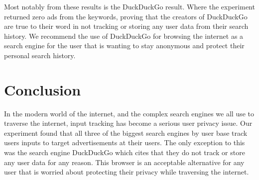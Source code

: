 \documentclass{article}
\begin{document}
Most notably from these results is the DuckDuckGo result. Where the experiment returned zero ads from the keywords, proving that the creators of DuckDuckGo are true to their word in not tracking or storing any user data from their search history. We recommend the use of DuckDuckGo for browsing the internet as a search engine for the user that is wanting to stay anonymous and protect their personal search history. 



\section{Conclusion}

  In the modern world of the internet, and the complex search engines we all use to traverse the internet, input tracking has become a serious user privacy issue. Our experiment found that all three of the biggest search engines by user base track users inputs to target advertisements at their users. The only exception to this was the search engine DuckDuckGo which cites that they do not track or store any user data for any reason. This browser is an acceptable alternative for any user that is worried about protecting their privacy while traversing the internet. 
\end{document}
